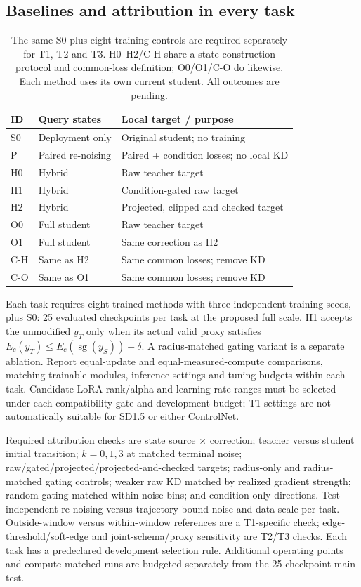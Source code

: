 \documentclass{article}
\newcommand{\sg}{\operatorname{sg}}
\begin{document}
\subsection{Baselines and attribution in every task}
\begin{table}[t]
\centering\small
\begin{tabular}{lll}
\toprule
ID & Query states & Local target / purpose\\
\midrule
S0 & Deployment only & Original student; no training\\
P & Paired re-noising & Paired + condition losses; no local KD\\
H0 & Hybrid & Raw teacher target\\
H1 & Hybrid & Condition-gated raw target\\
H2 & Hybrid & Projected, clipped and checked target\\
O0 & Full student & Raw teacher target\\
O1 & Full student & Same correction as H2\\
C-H & Same as H2 & Same common losses; remove KD\\
C-O & Same as O1 & Same common losses; remove KD\\
\bottomrule
\end{tabular}
\caption{The same S0 plus eight training controls are required separately for T1, T2 and T3. H0--H2/C-H share a state-construction protocol and common-loss definition; O0/O1/C-O do likewise. Each method uses its own current student. All outcomes are pending.}
\end{table}
Each task requires eight trained methods with three independent training seeds, plus S0: 25 evaluated checkpoints per task at the proposed full scale. H1 accepts the unmodified $y_T$ only when its actual valid proxy satisfies $E_c(y_T)\le E_c(\sg(y_S))+\delta$. A radius-matched gating variant is a separate ablation. Report equal-update and equal-measured-compute comparisons, matching trainable modules, inference settings and tuning budgets within each task. Candidate LoRA rank/alpha and learning-rate ranges must be selected under each compatibility gate and development budget; T1 settings are not automatically suitable for SD1.5 or either ControlNet.

Required attribution checks are state source $\times$ correction; teacher versus student initial transition; $k=0,1,3$ at matched terminal noise; raw/gated/projected/projected-and-checked targets; radius-only and radius-matched gating controls; weaker raw KD matched by realized gradient strength; random gating matched within noise bins; and condition-only directions. Test independent re-noising versus trajectory-bound noise and data scale per task. Outside-window versus within-window references are a T1-specific check; edge-threshold/soft-edge and joint-schema/proxy sensitivity are T2/T3 checks. Each task has a predeclared development selection rule. Additional operating points and compute-matched runs are budgeted separately from the 25-checkpoint main test.
\end{document}
